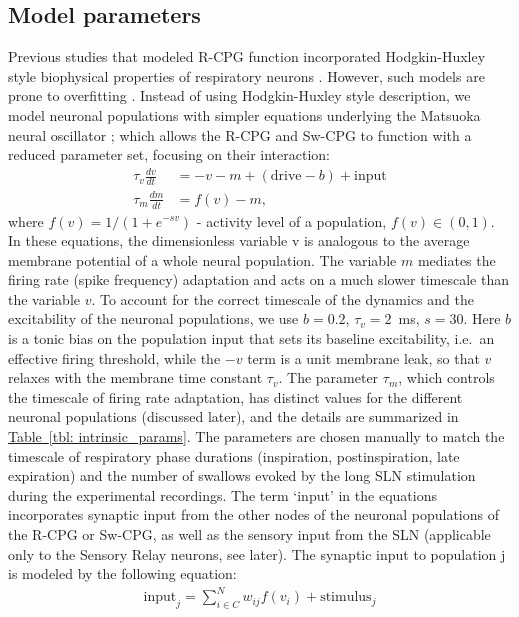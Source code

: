 \documentclass[pdflatex,sn-mathphys-ay]{sn-jnl}%
\renewcommand{\tableautorefname}{Table}
\newcommand{\Tableref}[2][]{\hyperref[#2]{\tableautorefname~\ref*{#2}#1}}
\theoremstyle{thmstyleone}%
\theoremstyle{thmstyletwo}%
\theoremstyle{thmstylethree}%
\begin{document}
\subsection{Model parameters}
Previous studies that modeled R-CPG function incorporated Hodgkin-Huxley style biophysical properties of respiratory neurons \citep{smith2007spatial, rubin2009multiple, molkov2013control, molkov2014closed, molkov2017computational}. However, such models are prone to overfitting \citep{del2018breathing}. Instead of using Hodgkin-Huxley style description, we model neuronal populations with simpler equations underlying the Matsuoka neural oscillator \citep{matsuoka2011analysis}; which allows the R-CPG and Sw-CPG to function with a reduced parameter set, focusing on their interaction:
\begin{align*}
 \tau_v \frac{dv}{dt} &= -v - m + (\text{drive} - b)+\text{input} \\
 \tau_m \frac{dm}{dt} &= f(v) - m,
\end{align*}
where $f(v) = 1/(1+e^{-s v} )$ - activity level of a population, $f(v) \in (0,1)$.
In these equations, the dimensionless variable v is analogous to the average membrane potential of a whole neural population. The variable $m$ mediates the firing rate (spike frequency) adaptation and acts on a much slower timescale than the variable $v$. To account for the correct timescale of the dynamics and the excitability of the neuronal populations, we use $b=0.2$, $\tau_v=2$~ms, $s=30$. Here $b$ is a tonic bias on the population input that sets its baseline excitability, i.e.\ an effective firing threshold, while the $-v$ term is a unit membrane leak, so that $v$ relaxes with the membrane time constant $\tau_v$. The parameter $\tau_m$, which controls the timescale of firing rate adaptation, has distinct values for the different neuronal populations (discussed later), and the details are summarized in \Tableref{tbl: intrinsic_params}. The parameters are chosen manually to match the timescale of respiratory phase durations (inspiration, postinspiration, late expiration) and the number of swallows evoked by the long SLN stimulation during the experimental recordings.
The term `input' in the equations incorporates synaptic input from the other nodes of the neuronal populations of the R-CPG or Sw-CPG, as well as the sensory input from the SLN (applicable only to the Sensory Relay neurons, see later). The synaptic input to population j is modeled by the following equation:
\begin{align*}
 \text{input}_j = \sum_{i \in C}^N w_{ij} f(v_i) +\text{stimulus}_j
\end{align*}
\end{document}
